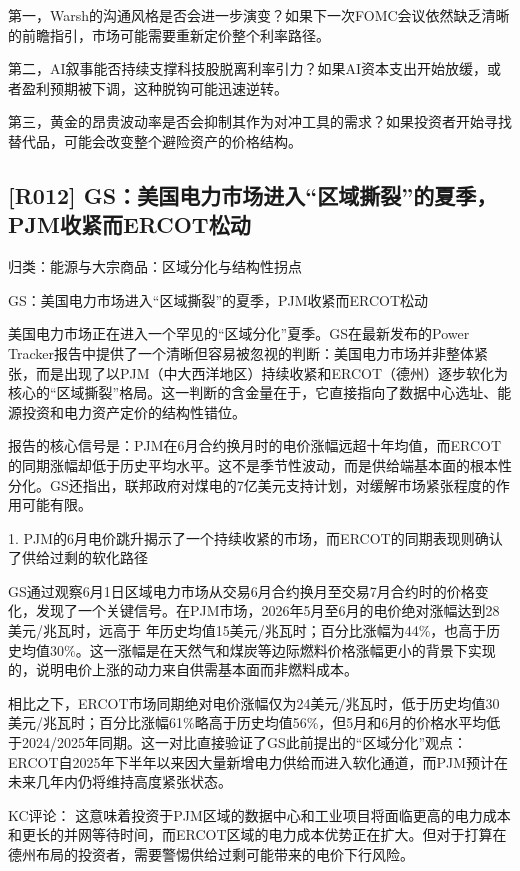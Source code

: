 \documentclass[11pt]{ctexart}
\begin{document}
第一，Warsh的沟通风格是否会进一步演变？如果下一次FOMC会议依然缺乏清晰的前瞻指引，市场可能需要重新定价整个利率路径。

第二，AI叙事能否持续支撑科技股脱离利率引力？如果AI资本支出开始放缓，或者盈利预期被下调，这种脱钩可能迅速逆转。

第三，黄金的昂贵波动率是否会抑制其作为对冲工具的需求？如果投资者开始寻找替代品，可能会改变整个避险资产的价格结构。

\subsection{[R012] GS：美国电力市场进入“区域撕裂”的夏季，PJM收紧而ERCOT松动}
{\small\color{refgray}归类：能源与大宗商品：区域分化与结构性拐点}

GS：美国电力市场进入“区域撕裂”的夏季，PJM收紧而ERCOT松动

美国电力市场正在进入一个罕见的“区域分化”夏季。GS在最新发布的Power Tracker报告中提供了一个清晰但容易被忽视的判断：美国电力市场并非整体紧张，而是出现了以PJM（中大西洋地区）持续收紧和ERCOT（德州）逐步软化为核心的“区域撕裂”格局。这一判断的含金量在于，它直接指向了数据中心选址、能源投资和电力资产定价的结构性错位。

报告的核心信号是：PJM在6月合约换月时的电价涨幅远超十年均值，而ERCOT的同期涨幅却低于历史平均水平。这不是季节性波动，而是供给端基本面的根本性分化。GS还指出，联邦政府对煤电的7亿美元支持计划，对缓解市场紧张程度的作用可能有限。

1. PJM的6月电价跳升揭示了一个持续收紧的市场，而ERCOT的同期表现则确认了供给过剩的软化路径

GS通过观察6月1日区域电力市场从交易6月合约换月至交易7月合约时的价格变化，发现了一个关键信号。在PJM市场，2026年5月至6月的电价绝对涨幅达到28美元/兆瓦时，远高于 年历史均值15美元/兆瓦时；百分比涨幅为44\%，也高于历史均值30\%。这一涨幅是在天然气和煤炭等边际燃料价格涨幅更小的背景下实现的，说明电价上涨的动力来自供需基本面而非燃料成本。

相比之下，ERCOT市场同期绝对电价涨幅仅为24美元/兆瓦时，低于历史均值30美元/兆瓦时；百分比涨幅61\%略高于历史均值56\%，但5月和6月的价格水平均低于2024/2025年同期。这一对比直接验证了GS此前提出的“区域分化”观点：ERCOT自2025年下半年以来因大量新增电力供给而进入软化通道，而PJM预计在未来几年内仍将维持高度紧张状态。

KC评论： 这意味着投资于PJM区域的数据中心和工业项目将面临更高的电力成本和更长的并网等待时间，而ERCOT区域的电力成本优势正在扩大。但对于打算在德州布局的投资者，需要警惕供给过剩可能带来的电价下行风险。
\end{document}
